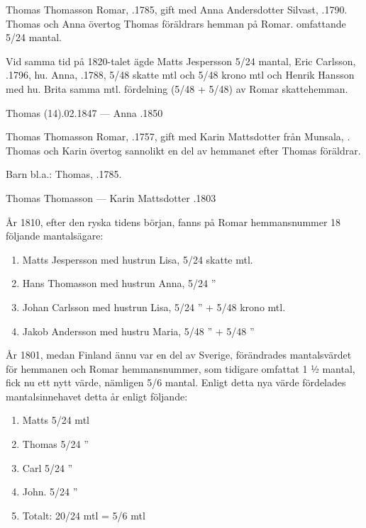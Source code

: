Thomas Thomasson Romar, .1785, gift med Anna Andersdotter Silvast, .1790. Thomas och Anna övertog Thomas föräldrars hemman på Romar. omfattande 5/24 mantal.

Vid samma tid på 1820-talet ägde Matts Jespersson 5/24 mantal, Eric Carlsson, .1796, hu. Anna, .1788,  5/48 skatte mtl och 5/48 krono mtl och Henrik Hansson med hu. Brita samma mtl. fördelning (5/48 + 5/48) av Romar skattehemman.
\begin{jhchildren}
  \item {}
  \item {}
  \item {}
  \item {}
\end{jhchildren}

Thomas (14).02.1847  ---  Anna .1850


Thomas Thomasson Romar, .1757, gift med Karin Mattsdotter från Munsala, . Thomas och Karin övertog sannolikt en del av hemmanet efter Thomas föräldrar.

Barn bl.a.: Thomas, .1785.

Thomas Thomasson   ---  Karin Mattsdotter .1803


År 1810, efter den ryska tidens början, fanns på Romar hemmansnummer 18 följande mantalsägare:
\begin{enumerate}
  \item Matts Jespersson med hustrun Lisa, 5/24 skatte mtl.
  \item Hans Thomasson med hustrun Anna,   5/24      ”
  \item Johan Carlsson med hustrun Lisa,   5/24      ”       + 5/48 krono mtl.
  \item Jakob Andersson med hustru Maria,  5/48      ”       + 5/48     ”
\end{enumerate}

År 1801, medan Finland ännu var en del av Sverige, förändrades mantalsvärdet för hemmanen och Romar hemmansnummer, som tidigare omfattat 1 ½ mantal, fick nu ett nytt värde, nämligen 5/6 mantal. Enligt detta nya värde fördelades mantalsinnehavet detta år enligt följande:
\begin{enumerate}
  \item Matts       5/24 mtl
  \item Thomas      5/24  ”
  \item Carl        5/24  ”
  \item John.       5/24  ”
  \item Totalt:   20/24 mtl = 5/6 mtl
\end{enumerate}

